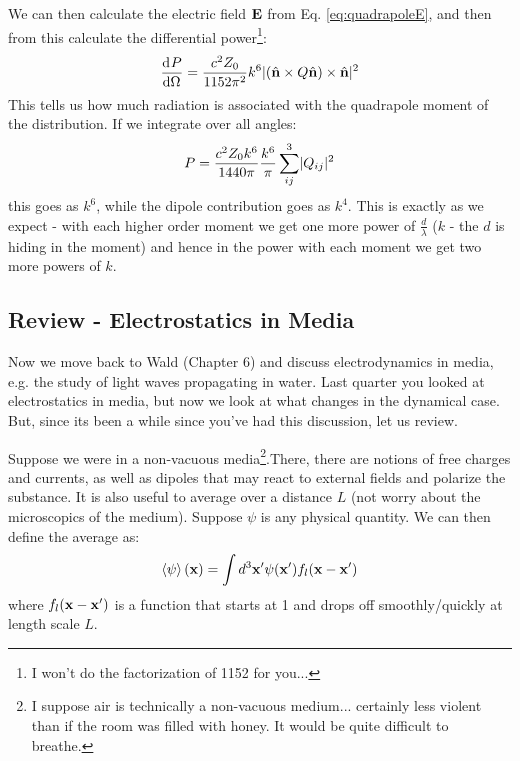 \begin{itemize}
    We can then calculate the electric field $\mathbf{E}$ from Eq. \eqref{eq:quadrapoleE}, and then from this calculate the differential power\footnote{I won't do the factorization of 1152 for you...}:
    \begin{equation}
        \dod{P}{\Omega} = \frac{c^2Z_0}{1152\pi^2}k^6\abs{(\hat{\v{n}} \times Q\hat{\v{n}}) \times \hat{\v{n}}}^2
    \end{equation}
    This tells us how much radiation is associated with the quadrapole moment of the distribution. If we integrate over all angles:
    \begin{equation}
        P = \frac{c^2Z_0k^6}{1440\pi}\frac{k^6}{\pi}\sum_{ij}^3\lvert Q_{ij} \rvert^2
    \end{equation}
    this goes as $k^6$, while the dipole contribution goes as $k^4$. This is exactly as we expect - with each higher order moment we get one more power of $\frac{d}{\lambda}$ ($k$ - the $d$ is hiding in the moment) and hence in the power with each moment we get two more powers of $k$.
\end{itemize}

\subsection{Review - Electrostatics in Media}
Now we move back to Wald (Chapter 6) and discuss electrodynamics in media, e.g. the study of light waves propagating in water.
Last quarter you looked at electrostatics in media, but now we look at what changes in the dynamical case. But, since its been a while since you've had this discussion, let us review. 

Suppose we were in a non-vacuous media\footnote{I suppose air is technically a non-vacuous medium... certainly less violent than if the room was filled with honey. It would be quite difficult to breathe.}.There, there are notions of free charges and currents, as well as dipoles that may react to external fields and polarize the substance. It is also useful to average over a distance $L$ (not worry about the microscopics of the medium). Suppose $\psi$ is any physical quantity. We can then define the average as:
\begin{equation}
    \left< \psi \right>(\mathbf{x}) = \int d^3\mathbf{x}' \psi(\mathbf{x}')f_l(\mathbf{x} - \mathbf{x}')
\end{equation}
where $f_l(\mathbf{x} - \mathbf{x}')$ is a function that starts at 1 and drops off smoothly/quickly at length scale $L$.

